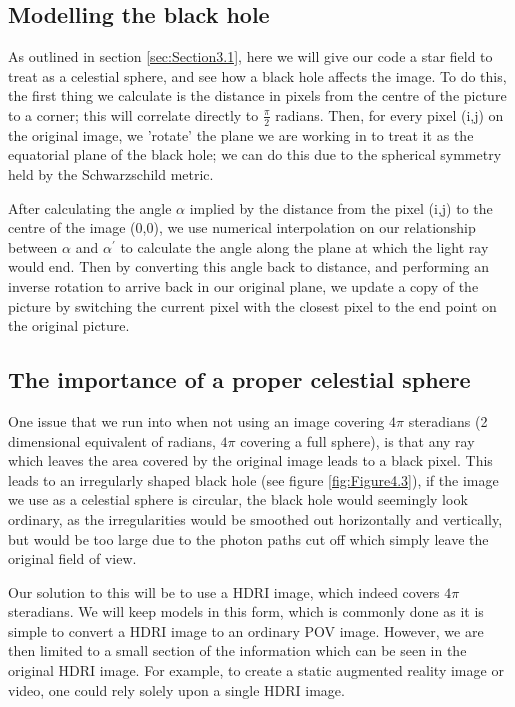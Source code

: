 \documentclass[oneside,openright,frontopenright, singlespacing]{dmathesis}
\begin{document}
\subsection{Modelling the black hole}\label{subsec:Subsection3.5.4}
	
	As outlined in section \ref{sec:Section3.1}, here we will give our code a star field to treat as a celestial sphere, and see how a black hole affects the image. To do this, the first thing we calculate is the distance in pixels from the centre of the picture to a corner; this will correlate directly to $\frac{\pi}{2}$ radians. Then, for every pixel (i,j) on the original image, we 'rotate' the plane we are working in to treat it as the equatorial plane of the black hole; we can do this due to the spherical symmetry held by the Schwarzschild metric. 

\vspace{1em}
	After calculating the angle $\alpha$ implied by the distance from the pixel (i,j) to the centre of the image (0,0), we use numerical interpolation on our relationship between $\alpha$ and $\alpha^{'}$ to calculate the angle along the plane at which the light ray would end. Then by converting this angle back to distance, and performing an inverse rotation to arrive back in our original plane, we update a copy of the picture by switching the current pixel with the closest pixel to the end point on the original picture.

\subsection{The importance of a proper celestial sphere}\label{subsec:Subsection3.5.5}

	One issue that we run into when not using an image covering $4\pi$ steradians (2 dimensional equivalent of radians, $4\pi$ covering a full sphere), is that any ray which leaves the area covered by the original image leads to a black pixel. This leads to an irregularly shaped black hole (see figure \ref{fig:Figure4.3}), if the image we use as a celestial sphere is circular, the black hole would seemingly look ordinary, as the irregularities would be smoothed out horizontally and vertically, but would be too large due to the photon paths cut off which simply leave the original field of view. 

\vspace{1em}
	Our solution to this will be to use a HDRI image, which indeed covers $4\pi$ steradians. We will keep models in this form, which is commonly done as it is simple to convert a HDRI image to an ordinary POV image. However, we are then limited to a small section of the information which can be seen in the original HDRI image. For example, to create a static augmented reality image or video, one could rely solely upon a single HDRI image.
\end{document}
